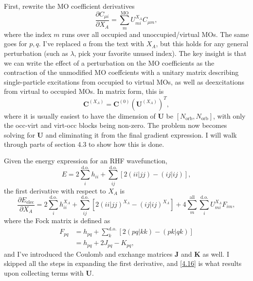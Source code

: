 \documentclass[%
class = book,%
crop = false,%
float = true,%
multi = true,%
preview = false,%
]{standalone}
\begin{document}
First, rewrite the MO coefficient derivatives
\begin{equation}
  \frac{\partial C_{\mu i}}{\partial X_{A}} = \sum_{m}^{\text{MO}} U_{mi}^{X_{A}} C_{\mu m}, \tag{Yamaguchi eq. 3.7}
\end{equation}
where the index \(m\) runs over all occupied and unoccupied/virtual MOs. The same goes for \(p,q\). I've replaced \(a\) from the text with \(X_{A}\), but this holds for any general perturbation (such as \(\lambda\), pick your favorite unused index). The key insight is that we can write the effect of a perturbation on the MO coefficients as the contraction of the unmodified MO coeffcients with a unitary matrix describing single-particle excitations from occupied to virtual MOs, as well as deexcitations from virtual to occupied MOs. In matrix form, this is
\begin{equation}
  \mathbf{C}^{(X_{A})} = \mathbf{C}^{(0)} \left( \mathbf{U}^{(X_{A})} \right)^{T},
\end{equation}
where it is usually easiest to have the dimension of \(\mathbf{U}\) be \([N_{\text{orb}}, N_{\text{orb}}]\), with only the occ-virt and virt-occ blocks being non-zero. The problem now becomes solving for \(\mathbf{U}\) and eliminating it from the final gradient expression. I will walk through parts of section 4.3 to show how this is done.

Given the energy expression for an RHF wavefunction,
\begin{equation}
  E = 2 \sum_{i}^{\text{d.o.}} h_{ii} + \sum_{ij}^{\text{d.o.}} \left[ 2(ii|jj) - (ij|ij) \right], \tag{Yamaguchi eq. 4.1}
\end{equation}
the first derivative with respect to \(X_{A}\) is
\begin{equation}
  \frac{\partial E_{\text{elec}}}{\partial X_{A}} = 2 \sum_{i}^{\text{d.o.}} h_{ii}^{X_{A}} + \sum_{ij}^{\text{d.o.}} \left[ 2(ii|jj)^{X_{A}} - (ij|ij)^{X_{A}} \right] + 4 \sum_{m}^{\text{all}} \sum_{i}^{\text{d.o.}} U_{mi}^{X_{A}} F_{im}, \label{4.16}\tag{Yamaguchi eq. 4.16}
\end{equation}
where the Fock matrix is defined as
\begin{align*}
  F_{pq} &= h_{pq} + \sum_{k}^{\text{d.o.}} \left[ 2(pq|kk) - (pk|qk) \right] \tag{Yamaguchi eq. 4.6} \\
         &= h_{pq} + 2J_{pq} - K_{pq},
\end{align*}
and I've introduced the Coulomb and exchange matrices \(\mathbf{J}\) and \(\mathbf{K}\) as well. I skipped all the steps in expanding the first derivative, and \eqref{4.16} is what results upon collecting terms with \(\mathbf{U}\).
\end{document}
